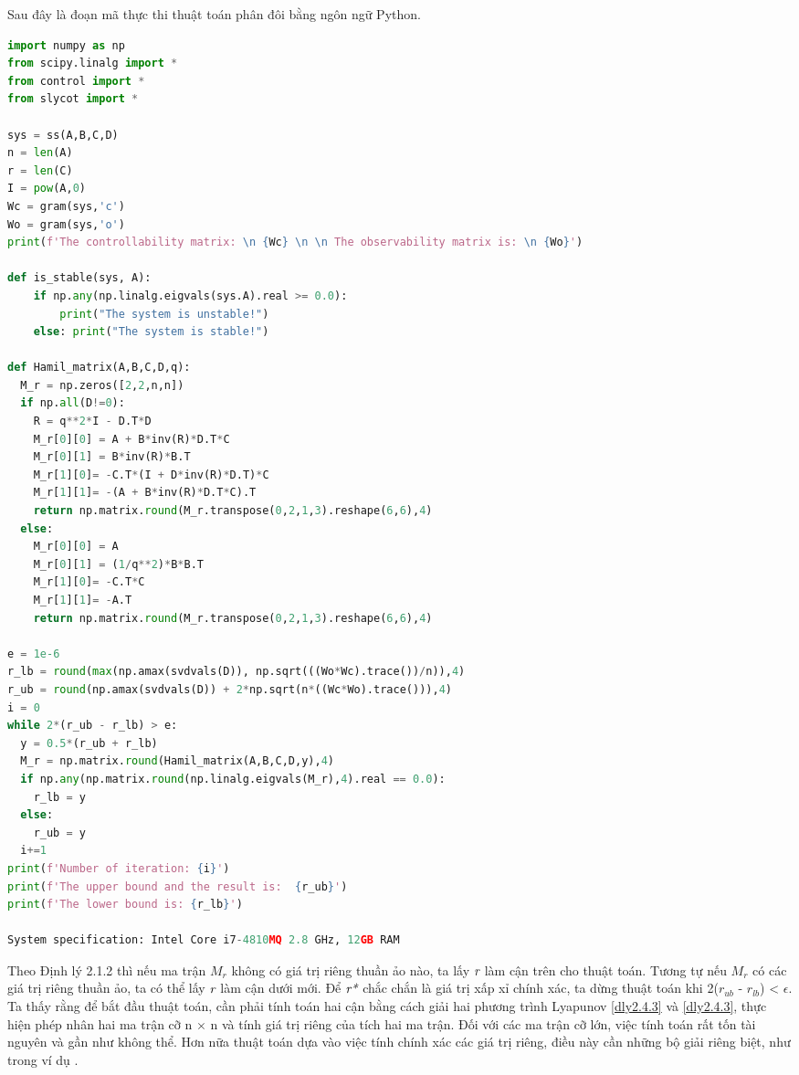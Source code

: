 \newpage
Sau đây là đoạn mã thực thi thuật toán phân đôi bằng ngôn ngữ Python.
\begin{lstlisting}[language=Python, caption=Thuật toán phân đôi]
import numpy as np
from scipy.linalg import *
from control import *
from slycot import *

sys = ss(A,B,C,D)
n = len(A)
r = len(C)
I = pow(A,0)
Wc = gram(sys,'c')
Wo = gram(sys,'o')
print(f'The controllability matrix: \n {Wc} \n \n The observability matrix is: \n {Wo}')

def is_stable(sys, A):
    if np.any(np.linalg.eigvals(sys.A).real >= 0.0):
        print("The system is unstable!")
    else: print("The system is stable!")

def Hamil_matrix(A,B,C,D,q):
  M_r = np.zeros([2,2,n,n])
  if np.all(D!=0):
    R = q**2*I - D.T*D
    M_r[0][0] = A + B*inv(R)*D.T*C
    M_r[0][1] = B*inv(R)*B.T
    M_r[1][0]= -C.T*(I + D*inv(R)*D.T)*C
    M_r[1][1]= -(A + B*inv(R)*D.T*C).T
    return np.matrix.round(M_r.transpose(0,2,1,3).reshape(6,6),4)
  else:
    M_r[0][0] = A
    M_r[0][1] = (1/q**2)*B*B.T
    M_r[1][0]= -C.T*C
    M_r[1][1]= -A.T
    return np.matrix.round(M_r.transpose(0,2,1,3).reshape(6,6),4)

e = 1e-6
r_lb = round(max(np.amax(svdvals(D)), np.sqrt(((Wo*Wc).trace())/n)),4)
r_ub = round(np.amax(svdvals(D)) + 2*np.sqrt(n*((Wc*Wo).trace())),4)
i = 0 
while 2*(r_ub - r_lb) > e:
  y = 0.5*(r_ub + r_lb)
  M_r = np.matrix.round(Hamil_matrix(A,B,C,D,y),4)
  if np.any(np.matrix.round(np.linalg.eigvals(M_r),4).real == 0.0):
    r_lb = y
  else:
    r_ub = y
  i+=1
print(f'Number of iteration: {i}')
print(f'The upper bound and the result is:  {r_ub}')
print(f'The lower bound is: {r_lb}')

System specification: Intel Core i7-4810MQ 2.8 GHz, 12GB RAM
\end{lstlisting}
Theo Định lý 2.1.2 thì nếu ma trận $M_r$ không có giá trị riêng thuần ảo nào, ta lấy $\emph{r}$ làm cận trên cho thuật toán. Tương tự nếu $M_r$ có các giá trị riêng thuần ảo, ta có thể lấy $\emph{r}$ làm cận dưới mới. Để $\emph{r*}$ chắc chắn là giá trị xấp xỉ chính xác, ta dừng thuật toán khi 2($r_{ub}$ - $r_{lb}$) < $\epsilon$.
\newline
Ta thấy rằng để bắt đầu thuật toán, cần phải tính toán hai cận bằng cách giải hai phương trình Lyapunov \eqref{dly2.4.3} và \eqref{dly2.4.3}, thực hiện phép nhân hai ma trận cỡ n $\times$ n và tính giá trị riêng của tích hai ma trận. Đối với các ma trận cỡ lớn, việc tính toán rất tốn tài nguyên và gần như không thể.
Hơn nữa thuật toán dựa vào việc tính chính xác các giá trị riêng, điều này cần những bộ giải riêng biệt, như trong ví dụ \cite{2}.
